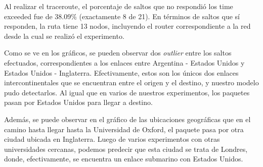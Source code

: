 Al realizar el traceroute, el porcentaje de saltos que no respondió los time exceeded fue de 38.09\% (exactamente 8 de 21). En términos de saltos que sí responden, la ruta tiene 13 nodos, incluyendo el router correspondiente a la red desde la cual se realizó el experimento.

Como se ve en los gráficos, se pueden observar dos \textit{outlier} entre los saltos efectuados, correspondientes a los enlaces entre Argentina - Estados Unidos y Estados Unidos - Inglaterra. Efectivamente, estos son los únicos dos enlaces intercontinentales que se encuentran entre el origen y el destino, y nuestro modelo pudo detectarlos. Al igual que en varios de nuestros experimentos, los paquetes pasan por Estados Unidos para llegar a destino.

Además, se puede observar en el gráfico de las ubicaciones geográficas que en el camino hasta llegar hasta la Universidad de Oxford, el paquete pasa por otra ciudad ubicada en Inglaterra. Luego de varios experimentos con otras universidades cercanas, podemos predecir que esta ciudad se trata de Londres, donde, efectivamente, se encuentra un enlace submarino con Estados Unidos.
